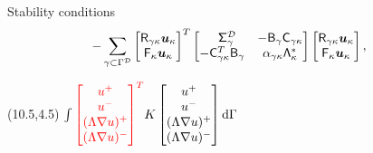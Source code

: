 \documentclass{beamer}
\begin{document}
\begin{frame} {Stability conditions}
\begin{equation*}
\begin{aligned}
    -& \sum_{\gamma \subset \Gamma^{\fnc{D}}}
    \begin{bmatrix} \Rgk \Ukp \\ \Gk \Ukp \end{bmatrix}^{T}
    \setlength{\arraycolsep}{5pt}
    \begin{bmatrix} \phnt{-}\Sig_{\gamma}^{\fnc{D}} & -\Bg \Cgk \\
    -\Cgk^T \Bg & \alpha_{\gamma \kappa}\Lam_{\kappa}^{*} \end{bmatrix}
    \begin{bmatrix} \Rgk \Ukp \\ \Gk \Ukp \end{bmatrix},
    \end{aligned}
    \end{equation*}
    \footnotesize
    \begin{textblock}{5.55}(10.5,4.5)
        $\int 
        {\color{red}\begin{bmatrix}
            u^+ \\ u^- \\ (\Lambda\nabla u)^+ \\ (\Lambda\nabla u)^-
        \end{bmatrix}^T}
        K\begin{bmatrix}
            u^+ \\ u^- \\ (\Lambda\nabla u)^+ \\ (\Lambda\nabla u)^-
        \end{bmatrix} 
        \mathrm{d} \Gamma $
    \end{textblock}

\end{frame}
\end{document}
